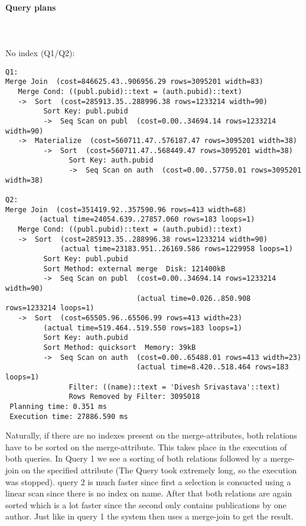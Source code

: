 \documentclass[11pt]{scrartcl}
\begin{document}
\paragraph{Query plans}\mbox{}\\
\\
\noindent No index (Q1/Q2):
{\small
\begin{verbatim}
Q1:
Merge Join  (cost=846625.43..906956.29 rows=3095201 width=83)
   Merge Cond: ((publ.pubid)::text = (auth.pubid)::text)
   ->  Sort  (cost=285913.35..288996.38 rows=1233214 width=90)
         Sort Key: publ.pubid
         ->  Seq Scan on publ  (cost=0.00..34694.14 rows=1233214 width=90)
   ->  Materialize  (cost=560711.47..576187.47 rows=3095201 width=38)
         ->  Sort  (cost=560711.47..568449.47 rows=3095201 width=38)
               Sort Key: auth.pubid
               ->  Seq Scan on auth  (cost=0.00..57750.01 rows=3095201 width=38)

Q2:
Merge Join  (cost=351419.92..357590.96 rows=413 width=68)
	    (actual time=24054.639..27857.060 rows=183 loops=1)
   Merge Cond: ((publ.pubid)::text = (auth.pubid)::text)
   ->  Sort  (cost=285913.35..288996.38 rows=1233214 width=90)
             (actual time=23183.951..26169.586 rows=1229958 loops=1)
         Sort Key: publ.pubid
         Sort Method: external merge  Disk: 121400kB
         ->  Seq Scan on publ  (cost=0.00..34694.14 rows=1233214 width=90)
                               (actual time=0.026..850.908 rows=1233214 loops=1)
   ->  Sort  (cost=65505.96..65506.99 rows=413 width=23)
	     (actual time=519.464..519.550 rows=183 loops=1)
         Sort Key: auth.pubid
         Sort Method: quicksort  Memory: 39kB
         ->  Seq Scan on auth  (cost=0.00..65488.01 rows=413 width=23)
                               (actual time=8.420..518.464 rows=183 loops=1)
               Filter: ((name)::text = 'Divesh Srivastava'::text)
               Rows Removed by Filter: 3095018
 Planning time: 0.351 ms
 Execution time: 27886.590 ms
\end{verbatim}
Naturally, if there are no indexes present on the merge-attributes, both relations have to be sorted on the merge-attribute. This takes place in the execution of both queries.
In Query 1 we see a sorting of both relations followed by a merge-join on the specified attribute (The Query took extremely long, so the execution was stopped).
query 2 is much faster since first a selection is consucted using a linear scan since there is no index on name. After that both relations are again sorted which is a lot faster
since the second only contains publications by one author. Just like in query 1 the system then uses a merge-join to get the result.
}
\end{document}
